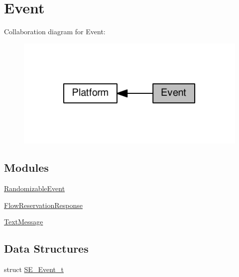 \hypertarget{group__Event}{}\section{Event}
\label{group__Event}
Collaboration diagram for Event\+:\nopagebreak
\begin{figure}[H]
\begin{center}
\leavevmode
\includegraphics[width=350pt]{group__Event}
\end{center}
\end{figure}
\subsection*{Modules}
\begin{DoxyCompactItemize}
\item 
\hyperlink{group__RandomizableEvent}{Randomizable\+Event}
\item 
\hyperlink{group__FlowReservationResponse}{Flow\+Reservation\+Response}
\item 
\hyperlink{group__TextMessage}{Text\+Message}
\end{DoxyCompactItemize}
\subsection*{Data Structures}
\begin{DoxyCompactItemize}
\item 
struct \hyperlink{structSE__Event__t}{S\+E\+\_\+\+Event\+\_\+t}
\end{DoxyCompactItemize}
